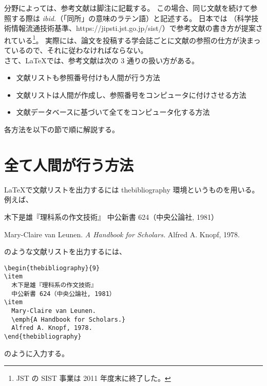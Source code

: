 分野によっては、参考文献は脚注に記載する。
この場合、同じ文献を続けて参照する際は \emph{ibid.}（「同所」の意味のラテン語）と記述する。
日本では （科学技術情報流通技術基準、https://jipsti.jst.go.jp/sist/）で参考文献の書き方が提案されている\footnote{JST の SIST 事業は 2011 年度末に終了した。}。
実際には、論文を投稿する学会誌ごとに文献の参照の仕方が決まっているので、それに従わなければならない。\\

さて、\LaTeX{}では、参考文献は次の 3 通りの扱い方がある。
\begin{itemize}\setlength{\leftskip}{-1.00zw}%
\item 文献リストも参照番号付けも人間が行う方法
\item 文献リストは人間が作成し、参照番号をコンピュータに付けさせる方法
\item 文献データベースに基づいて全てをコンピュータ化する方法
\end{itemize}
各方法を以下の節で順に解説する。
\section{全て人間が行う方法}
\LaTeX{}で文献リストを出力するには thebibliography 環境というものを用いる。
例えば、
\begin{mdframed}[roundcorner=0.50zw,leftmargin=3.00zw,rightmargin=3.00zw,skipabove=0.40zw,skipbelow=0.40zw,innertopmargin=4.00pt,innerbottommargin=4.00pt,innerleftmargin=5.00pt,innerrightmargin=5.00pt,linecolor=gray!100,linewidth=0.50pt,backgroundcolor=gray!00]
  \begin{thebibliography}{9}%
  \item
    木下是雄『理科系の作文技術』
    中公新書 624（中央公論社, 1981）
  \item
    Mary-Claire van Leunen.
    \emph{A Handbook for Scholars.}
    Alfred A. Knopf, 1978.
  \end{thebibliography}
\end{mdframed}
のような文献リストを出力するには、
\begin{mdframed}[roundcorner=0.50zw,leftmargin=3.00zw,rightmargin=3.00zw,skipabove=0.40zw,skipbelow=0.40zw,innertopmargin=4.00pt,innerbottommargin=4.00pt,innerleftmargin=5.00pt,innerrightmargin=5.00pt,linecolor=gray!020,linewidth=0.50pt,backgroundcolor=gray!20]
\begin{verbatim}
\begin{thebibliography}{9}
\item
  木下是雄『理科系の作文技術』
  中公新書 624（中央公論社, 1981）
\item
  Mary-Claire van Leunen.
  \emph{A Handbook for Scholars.}
  Alfred A. Knopf, 1978.
\end{thebibliography}
\end{verbatim}
\end{mdframed}
のように入力する。\\

